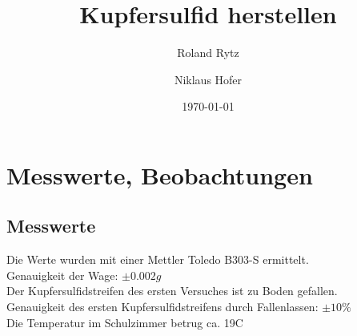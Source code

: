 \documentclass[11pt,paper=a4,final]{scrartcl}
\title{Kupfersulfid herstellen}
\author{Roland Rytz \and Niklaus Hofer}
\date{\today{}}
\begin{document}
\maketitle
\newpage
\tableofcontents
\section{Messwerte, Beobachtungen}
\subsection{Messwerte}
Die Werte wurden mit einer Mettler Toledo B303-S ermittelt.\\
Genauigkeit der Wage: \(\pm 0.002g\)\\
Der Kupfersulfidstreifen des ersten Versuches ist zu Boden gefallen. \\
Genauigkeit des ersten Kupfersulfidstreifens durch Fallenlassen: \(\pm 10\% \)\\
Die Temperatur im Schulzimmer betrug ca. 19\textdegree C
\end{document}
